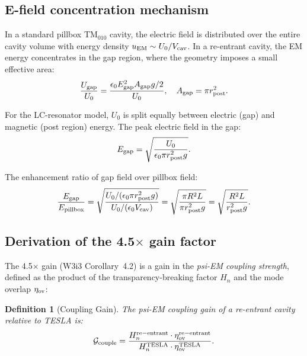 \documentclass[11pt,twocolumn]{article}
\newcommand{\Vcav}{V_{\rm cav}}
\newtheorem{definition}[theorem]{Definition}
\begin{document}
\subsection{E-field concentration mechanism}
\label{sec:efield_concentration}

In a standard pillbox TM$_{010}$ cavity, the electric field is distributed
over the entire cavity volume with energy density $u_{\rm EM}\sim U_0/\Vcav$.
In a re-entrant cavity, the EM energy concentrates in the gap region,
where the geometry imposes a small effective area:
\begin{equation}
\frac{U_{\rm gap}}{U_0} = \frac{\epsilon_0 E_{\rm gap}^2 A_{\rm gap} g/2}{U_0},
\quad A_{\rm gap} = \pi r_{\rm post}^2.
\label{eq:gap_fraction}
\end{equation}

For the LC-resonator model, $U_0$ is split equally between electric (gap)
and magnetic (post region) energy. The peak electric field in the gap:
\begin{equation}
E_{\rm gap} = \sqrt{\frac{U_0}{\epsilon_0 \pi r_{\rm post}^2 g}}.
\label{eq:E_gap}
\end{equation}

The enhancement ratio of gap field over pillbox field:
\begin{equation}
\frac{E_{\rm gap}}{E_{\rm pillbox}}
= \sqrt{\frac{U_0/(\epsilon_0\pi r_{\rm post}^2 g)}
             {U_0/(\epsilon_0\Vcav)}}
= \sqrt{\frac{\pi R^2 L}{\pi r_{\rm post}^2 g}}
= \sqrt{\frac{R^2 L}{r_{\rm post}^2 g}}.
\label{eq:E_enhancement}
\end{equation}

\subsection{Derivation of the 4.5$\times$ gain factor}
\label{sec:gain_derivation}

The 4.5$\times$ gain (W3i3 Corollary~4.2) is a gain in the
\emph{psi-EM coupling strength}, defined as the product of the
transparency-breaking factor $H_n$ and the mode overlap $\eta_{\rm ov}$:

\begin{definition}[Coupling Gain]
\label{def:coupling_gain}
The psi-EM coupling gain of a re-entrant cavity relative to TESLA is:
\begin{equation}
\mathcal{G}_{\rm couple}
= \frac{H_n^{\rm re-entrant}\cdot\eta_{\rm ov}^{\rm re-entrant}}
       {H_n^{\rm TESLA}\cdot\eta_{\rm ov}^{\rm TESLA}}.
\label{eq:coupling_gain_def}
\end{equation}
\end{definition}
\end{document}
